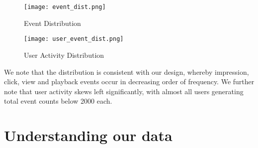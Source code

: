 \documentclass[10pt,titlepage]{article}
\begin{document}
\pagebreak

\begin{center}
\begin{figure}[H]
    \centering
    \texttt{[image: event\_dist.png]}
    \caption{Event Distribution}
    \label{fig:event_dist}

    \hspace*{-2cm}\texttt{[image: user\_event\_dist.png]}
    \caption{User Activity Distribution}
    \label{fig:user_event_dist}
\end{figure}
\end{center}

We note that the distribution is consistent with our design, whereby impression, click, view and
playback events occur in decreasing order of frequency. We further note that user activity skews left significantly,
with almost all users generating total event counts below 2000 each.


\section{Understanding our data}
\end{document}
